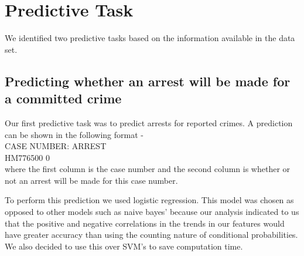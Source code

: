 \documentclass[journal]{IEEEtran}
\begin{document}
\section{Predictive Task}

We identified two predictive tasks based on the information available in the data set. 

\subsection{\textbf{Predicting whether an arrest will be made for a committed crime}}
Our first predictive task was to predict arrests for reported crimes.
A prediction can be shown in the following format - \\
CASE NUMBER: \hspace{1cm} ARREST\\
HM776500 \hspace{2cm}	0\\
where the first column is the case number and the second column is whether or not an arrest will be made for this case number. 

To perform this prediction we used logistic regression. This model was chosen as opposed to other models such as naive bayes' because our analysis indicated to us that the positive and negative correlations in the trends in our features would have greater accuracy than using the counting nature of conditional probabilities. We also decided to use this over SVM's to save computation time. 
\end{document}
